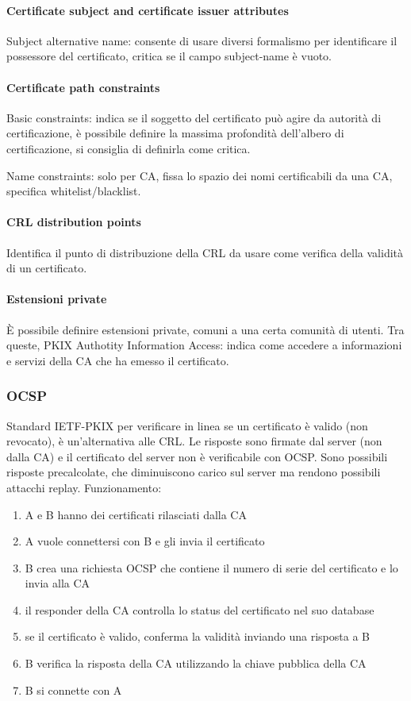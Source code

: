 \documentclass[11pt]{article}
\begin{document}
\paragraph*{Certificate subject and certificate issuer attributes}
Subject alternative name: consente di usare diversi formalismo per identificare il possessore del certificato, critica se 
il campo subject-name è vuoto.
\paragraph*{Certificate path constraints}
Basic constraints: indica se il soggetto del certificato può agire da autorità di certificazione, è possibile definire la 
massima profondità dell'albero di certificazione, si consiglia di definirla come critica.

Name constraints: solo per CA, fissa lo spazio dei nomi certificabili da una CA, specifica whitelist/blacklist.
\paragraph*{CRL distribution points}
Identifica il punto di distribuzione della CRL da usare come verifica della validità di un certificato.
\paragraph*{Estensioni private}
È possibile definire estensioni private, comuni a una certa comunità di utenti. Tra queste, PKIX Authotity Information Access:
indica come accedere a informazioni e servizi della CA che ha emesso il certificato.
\subsubsection{OCSP}
Standard IETF-PKIX per verificare in linea se un certificato è valido (non revocato), è un'alternativa alle CRL. 
Le risposte sono firmate dal server (non dalla CA) e il certificato del server non è verificabile con OCSP.
Sono possibili risposte precalcolate, che diminuiscono carico sul server ma rendono possibili attacchi replay.
Funzionamento:
\begin{enumerate}
    \item A e B hanno dei certificati rilasciati dalla CA 
    \item A vuole connettersi con B e gli invia il certificato 
    \item B crea una richiesta OCSP che contiene il numero di serie del certificato e lo invia alla CA 
    \item il responder della CA controlla lo status del certificato nel suo database
    \item se il certificato è valido, conferma la validità inviando una risposta a B 
    \item B verifica la risposta della CA utilizzando la chiave pubblica della CA 
    \item B si connette con A 
\end{enumerate} 
\end{document}
